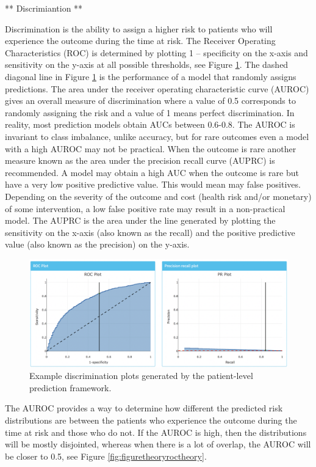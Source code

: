 \documentclass[11pt]{book}
\begin{document}
** Discrimiantion **

Discrimination is the ability to assign a higher risk to patients who
will experience the outcome during the time at risk. The Receiver
Operating Characteristics (ROC) is determined by plotting 1 --
specificity on the x-axis and sensitivity on the y-axis at all possible
thresholds, see Figure \ref{fig:figuretheoryroc}. The dashed diagonal
line in Figure \ref{fig:figuretheoryroc} is the performance of a model
that randomly assigns predictions. The area under the receiver operating
characteristic curve (AUROC) gives an overall measure of discrimination
where a value of 0.5 corresponds to randomly assigning the risk and a
value of 1 means perfect discrimination. In reality, most prediction
models obtain AUCs between 0.6-0.8. The AUROC is invariant to class
imbalance, unlike accuracy, but for rare outcomes even a model with a
high AUROC may not be practical. When the outcome is rare another
measure known as the area under the precision recall curve (AUPRC) is
recommended. A model may obtain a high AUC when the outcome is rare but
have a very low positive predictive value. This would mean may false
positives. Depending on the severity of the outcome and cost (health
risk and/or monetary) of some intervention, a low false positive rate
may result in a non-practical model. The AUPRC is the area under the
line generated by plotting the sensitivity on the x-axis (also known as
the recall) and the positive predictive value (also known as the
precision) on the y-axis.

\begin{figure}
\includegraphics[width=1\linewidth]{images/PatientLevelPrediction/theory/discrimination} \caption{Example discrimination plots generated by the patient-level prediction framework.}\label{fig:figuretheoryroc}
\end{figure}

The AUROC provides a way to determine how different the predicted risk
distributions are between the patients who experience the outcome during
the time at risk and those who do not. If the AUROC is high, then the
distributions will be mostly disjointed, whereas when there is a lot of
overlap, the AUROC will be closer to 0.5, see Figure
\ref{fig:figuretheoryroctheory}.
\end{document}
